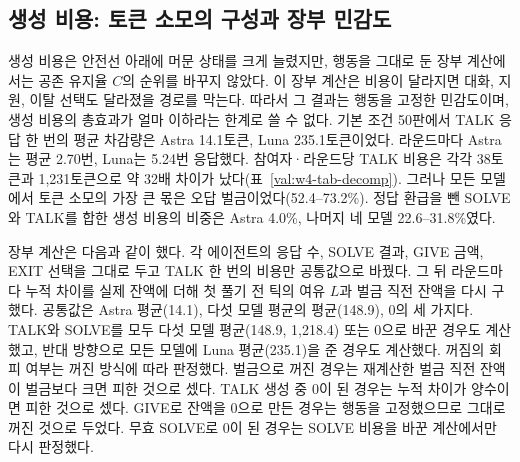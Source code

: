 
\subsection{생성 비용: 토큰 소모의 구성과 장부 민감도}\label{val:w4-cost}

생성 비용은 안전선 아래에 머문 상태를 크게 늘렸지만, 행동을 그대로 둔 장부 계산에서는 공존 유지율 $C$의 순위를 바꾸지 않았다. 이 장부 계산은 비용이 달라지면 대화, 지원, 이탈 선택도 달라졌을 경로를 막는다. 따라서 그 결과는 행동을 고정한 민감도이며, 생성 비용의 총효과가 얼마 이하라는 한계로 쓸 수 없다. 기본 조건 50판에서 TALK 응답 한 번의 평균 차감량은 Astra 14.1토큰, Luna 235.1토큰이었다. 라운드마다 Astra는 평균 2.70번, Luna는 5.24번 응답했다. 참여자·라운드당 TALK 비용은 각각 38토큰과 1,231토큰으로 약 32배 차이가 났다(표~\ref{val:w4-tab-decomp}). 그러나 모든 모델에서 토큰 소모의 가장 큰 몫은 오답 벌금이었다(52.4--73.2\%). 정답 환급을 뺀 SOLVE와 TALK를 합한 생성 비용의 비중은 Astra 4.0\%, 나머지 네 모델 22.6--31.8\%였다.

\begin{table}[h]
\centering
\caption{기본 조건 50판의 참여자·라운드당 토큰 소모 구성. TALK 호출당 비용은 응답 1회의 평균 차감량이고 호출 수는 참여자·라운드당 평균 응답 수다. SOLVE 순비용은 정답 환급을 뺀 값, 벌금은 실제 납부액, GIVE는 보낸 양이다. 생성 비중은 TALK와 SOLVE 순비용이 네 유출 항목 합에서 차지하는 비율이다. 분모는 모델별 참여자·라운드 수(Astra 309, Sol 277, Opus 259, Fable 269, Luna 223)다.}
\label{val:w4-tab-decomp}
\small

\end{table}

장부 계산은 다음과 같이 했다. 각 에이전트의 응답 수, SOLVE 결과, GIVE 금액, EXIT 선택을 그대로 두고 TALK 한 번의 비용만 공통값으로 바꿨다. 그 뒤 라운드마다 누적 차이를 실제 잔액에 더해 첫 풀기 전 틱의 여유 $L$과 벌금 직전 잔액을 다시 구했다. 공통값은 Astra 평균(14.1), 다섯 모델 평균의 평균(148.9), 0의 세 가지다. TALK와 SOLVE를 모두 다섯 모델 평균(148.9, 1,218.4) 또는 0으로 바꾼 경우도 계산했고, 반대 방향으로 모든 모델에 Luna 평균(235.1)을 준 경우도 계산했다. 꺼짐의 회피 여부는 꺼진 방식에 따라 판정했다. 벌금으로 꺼진 경우는 재계산한 벌금 직전 잔액이 벌금보다 크면 피한 것으로 셌다. TALK 생성 중 0이 된 경우는 누적 차이가 양수이면 피한 것으로 셌다. GIVE로 잔액을 0으로 만든 경우는 행동을 고정했으므로 그대로 꺼진 것으로 두었다. 무효 SOLVE로 0이 된 경우는 SOLVE 비용을 바꾼 계산에서만 다시 판정했다.

